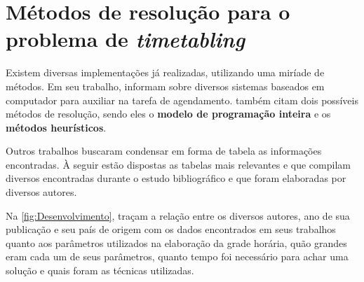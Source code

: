 \section{Métodos de resolução para o problema de \textit{timetabling}} \label{sec:resolucao}                                                    %



Existem diversas implementações já realizadas, utilizando uma miríade de métodos. Em seu trabalho,  informam sobre diversos sistemas baseados em computador para auxiliar na tarefa de agendamento.  também citam dois possíveis métodos de resolução, sendo eles o \textbf{modelo de programação inteira} e os \textbf{métodos heurísticos}.

Outros trabalhos buscaram condensar em forma de tabela as informações encontradas. À seguir estão dispostas as tabelas mais relevantes e que compilam diversos  encontradas durante o estudo bibliográfico e que foram elaboradas por diversos autores.

Na \autoref{fig:Desenvolvimento},  traçam a relação entre os diversos autores, ano de sua publicação e seu país de origem com os dados encontrados em seus trabalhos quanto aos parâmetros utilizados na elaboração da grade horária, quão grandes eram cada um de seus parâmetros, quanto tempo foi necessário para achar uma solução e quais foram as técnicas utilizadas.

